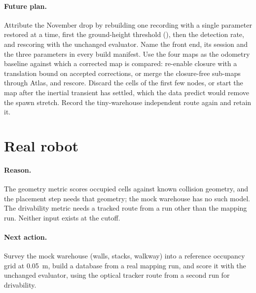 \documentclass[11pt,a4paper,notitlepage]{report}
\begin{document}
\paragraph{Future plan.} Attribute the November drop by rebuilding one
recording with a single parameter restored at a time, first the ground-height
threshold (), then the detection rate, and rescoring
with the unchanged evaluator. Name the front end, its
session and the three parameters in every build manifest. Use the four maps as
the odometry baseline against which a corrected map is compared: re-enable
closure with a translation bound on accepted corrections, or merge the
closure-free sub-maps through Atlas, and rescore. Discard the cells of the
first few nodes, or start the map after the inertial transient has settled,
which the data predict would remove the spawn stretch. Record the
tiny-warehouse independent route again and retain it.

\FloatBarrier
\section{Real robot}
\label{sec:map-real}


\paragraph{Reason.} The geometry metric scores occupied cells against known
collision geometry, and the placement step needs that geometry; the mock
warehouse has no such model. The drivability metric needs a tracked route from
a run other than the mapping run. Neither input exists at the cutoff.

\paragraph{Next action.} Survey the mock warehouse (walls, stacks, walkway)
into a reference occupancy grid at \SI{0.05}{\metre}, build a database from a
real mapping run, and score it with the unchanged evaluator, using the optical
tracker route from a second run for drivability.
\end{document}
